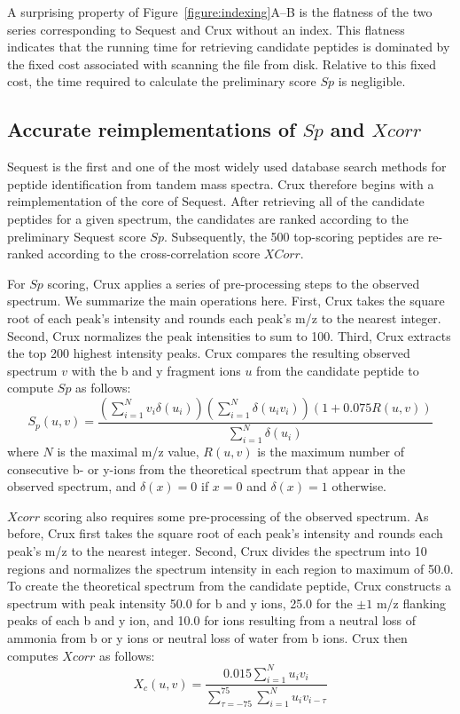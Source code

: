 \documentclass[12pt]{article}
\begin{document}
A surprising property of Figure~\ref{figure:indexing}A--B is the
flatness of the two series corresponding to {\sc Sequest} and Crux
without an index.  This flatness indicates that the running time for
retrieving candidate peptides is dominated by the fixed cost
associated with scanning the file from disk.  Relative to this fixed
cost, the time required to calculate the preliminary score $Sp$ is
negligible.

\subsection{Accurate reimplementations of $Sp$ and $Xcorr$}

{\sc Sequest} is the first and one of the most widely used database
search methods for peptide identification from tandem mass spectra.
Crux therefore begins with a reimplementation of the core of {\sc
Sequest}.  After retrieving all of the candidate peptides for a given
spectrum, the candidates are ranked according to the preliminary {\sc
Sequest} score $Sp$.  Subsequently, the 500 top-scoring peptides are
re-ranked according to the cross-correlation score $XCorr$.

For $Sp$ scoring, Crux applies a series of pre-processing steps to the
observed spectrum.  We summarize the main operations here.  First,
Crux takes the square root of each peak's intensity and rounds each
peak's m/z to the nearest integer.  Second, Crux normalizes the peak
intensities to sum to 100.  Third, Crux extracts the top 200 highest
intensity peaks.  Crux compares the resulting observed spectrum $v$
with the b and y fragment ions $u$ from the candidate peptide to
compute $Sp$ as follows:
\[
S_p(u, v) = \frac{
\left(\sum_{i=1}^N v_i \delta(u_i) \right)
\left(\sum_{i=1}^N \delta(u_i v_i)\right)
\left(1 + 0.075 R(u, v) \right)
}{\sum_{i=1}^N \delta(u_i)}
\]
where $N$ is the maximal m/z value, $R(u, v)$ is the maximum number of
consecutive b- or y-ions from the theoretical spectrum that appear in
the observed spectrum, and $\delta(x) = 0$ if $x=0$ and $\delta(x) =
1$ otherwise.

$Xcorr$ scoring also requires some pre-processing of the observed
spectrum.  As before, Crux first takes the square root of each peak's
intensity and rounds each peak's m/z to the nearest integer.  Second,
Crux divides the spectrum into 10 regions and normalizes the spectrum
intensity in each region to maximum of 50.0. To create the theoretical
spectrum from the candidate peptide, Crux constructs a spectrum with
peak intensity 50.0 for b and y ions, 25.0 for the $\pm 1$ m/z flanking
peaks of each b and y ion, and 10.0 for ions resulting from a neutral
loss of ammonia from b or y ions or neutral loss of water from b ions.
Crux then computes $Xcorr$ as follows:
\[
X_c(u, v) = \frac{0.015\sum_{i=1}^N u_i v_i}
{\sum_{\tau=-75}^{75} \sum_{i=1}^N u_i v_{i-\tau}}
\]
\end{document}
